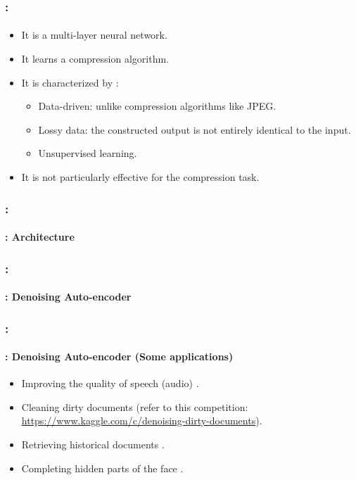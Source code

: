 \documentclass[xcolor=table]{beamer}
\begin{document}
\begin{frame}
	\frametitle{\insertshortsubtitle: \insertsection}
	\framesubtitle{\insertsubsection}
	
	\begin{itemize}
		\item It is a multi-layer neural network.
		\item It learns a compression algorithm.
		\item It is characterized by \cite{2016-keras}:
		\begin{itemize}
			\item Data-driven: unlike compression algorithms like JPEG.
			\item Lossy data: the constructed output is not entirely identical to the input.
			\item Unsupervised learning.
		\end{itemize}
		\item It is not particularly effective for the compression task.
	\end{itemize}

\end{frame}

\begin{frame}
	\frametitle{\insertshortsubtitle: \insertsection}
	\framesubtitle{\insertsubsection: Architecture}


\end{frame}

\begin{frame}
	\frametitle{\insertshortsubtitle: \insertsection}
	\framesubtitle{\insertsubsection: Denoising Auto-encoder}


\end{frame}

\begin{frame}
	\frametitle{\insertshortsubtitle: \insertsection}
	\framesubtitle{\insertsubsection: Denoising Auto-encoder (Some applications)}
	
	\begin{itemize}
		\item Improving the quality of speech (audio) \cite{2013-lu}.
		\item Cleaning dirty documents (refer to this competition: \url{https://www.kaggle.com/c/denoising-dirty-documents}).
		\item Retrieving historical documents \cite{2019-neji}.
		\item Completing hidden parts of the face \cite{2017-li-al}.
	\end{itemize}

\end{frame}
\end{document}
